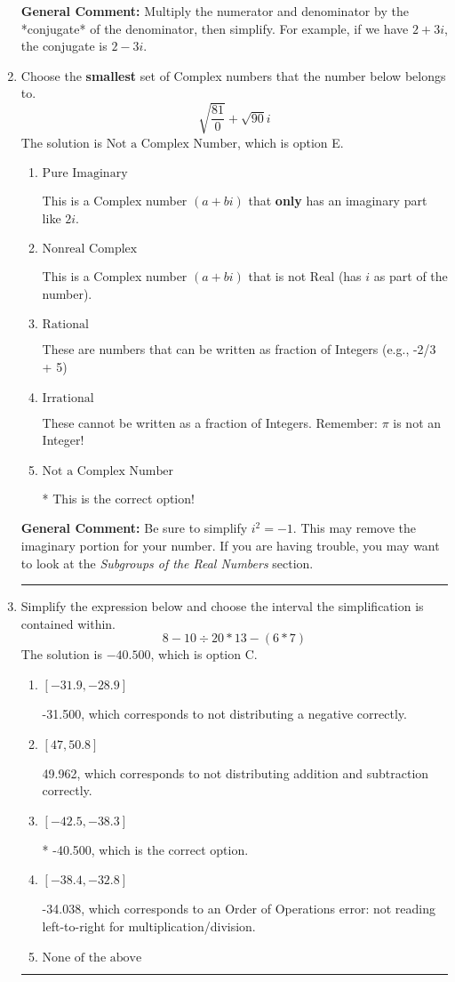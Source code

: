 \documentclass{extbook}[14pt]
\newcommand{\litem}[1]{\item #1

\rule{\textwidth}{0.4pt}}
\begin{document}
\begin{enumerate}
{\textbf{General Comment:} Multiply the numerator and denominator by the *conjugate* of the denominator, then simplify. For example, if we have $2+3i$, the conjugate is $2-3i$.
}
\litem{
Choose the \textbf{smallest} set of Complex numbers that the number below belongs to.
\[ \sqrt{\frac{81}{0}}+\sqrt{90} i \]The solution is \( \text{Not a Complex Number} \), which is option E.\begin{enumerate}[label=\Alph*.]
\item \( \text{Pure Imaginary} \)

This is a Complex number $(a+bi)$ that \textbf{only} has an imaginary part like $2i$.
\item \( \text{Nonreal Complex} \)

This is a Complex number $(a+bi)$ that is not Real (has $i$ as part of the number).
\item \( \text{Rational} \)

These are numbers that can be written as fraction of Integers (e.g., -2/3 + 5)
\item \( \text{Irrational} \)

These cannot be written as a fraction of Integers. Remember: $\pi$ is not an Integer!
\item \( \text{Not a Complex Number} \)

* This is the correct option!
\end{enumerate}

\textbf{General Comment:} Be sure to simplify $i^2 = -1$. This may remove the imaginary portion for your number. If you are having trouble, you may want to look at the \textit{Subgroups of the Real Numbers} section.
}
\litem{
Simplify the expression below and choose the interval the simplification is contained within.
\[ 8 - 10 \div 20 * 13 - (6 * 7) \]The solution is \( -40.500 \), which is option C.\begin{enumerate}[label=\Alph*.]
\item \( [-31.9, -28.9] \)

 -31.500, which corresponds to not distributing a negative correctly.
\item \( [47, 50.8] \)

 49.962, which corresponds to not distributing addition and subtraction correctly.
\item \( [-42.5, -38.3] \)

* -40.500, which is the correct option.
\item \( [-38.4, -32.8] \)

 -34.038, which corresponds to an Order of Operations error: not reading left-to-right for multiplication/division.
\item \( \text{None of the above} \)


\end{enumerate}}
\end{enumerate}
\end{document}
